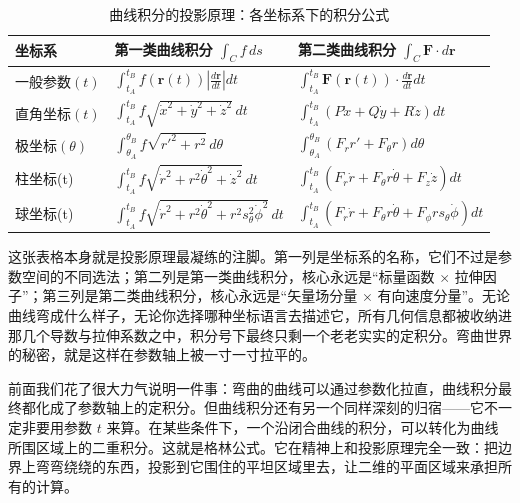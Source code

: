 \documentclass[UTF8]{ctexbook}
\begin{document}
\begin{table}[htbp]
\centering
\caption{曲线积分的投影原理：各坐标系下的积分公式}
\medskip
\label{tab:curve_integral}
\renewcommand{\arraystretch}{1.6}
\begin{tabular}{p{2.8cm}|p{6.5cm}|p{6.5cm}}
\toprule
\textbf{坐标系} & \textbf{第一类曲线积分 $\int_C f \, ds$} & \textbf{第二类曲线积分 $\int_C \mathbf{F} \cdot d\mathbf{r}$} \\
\midrule
一般参数\;$(t)$ & $\displaystyle \int_{t_A}^{t_B} f(\mathbf{r}(t)) \left| \frac{d\mathbf{r}}{dt} \right| dt$ & $\displaystyle \int_{t_A}^{t_B} \mathbf{F}(\mathbf{r}(t)) \cdot \frac{d\mathbf{r}}{dt} dt$ \\
\midrule
直角坐标\;$(t)$ & $\displaystyle \int_{t_A}^{t_B} f \sqrt{\dot{x}^2 + \dot{y}^2 + \dot{z}^2} \, dt$ & $\displaystyle \int_{t_A}^{t_B} \left( P\dot{x} + Q\dot{y} + R\dot{z} \right) dt$ \\
\midrule
极坐标\;$(\theta)$ & $\displaystyle \int_{\theta_A}^{\theta_B} f \sqrt{r'^2 + r^2} \, d\theta$ & $\displaystyle \int_{\theta_A}^{\theta_B} \left( F_r r' + F_\theta r \right) d\theta$ \\
\midrule
柱坐标\;(t) & $\displaystyle \int_{t_A}^{t_B} f \sqrt{\dot{r}^2 + r^2 \dot{\theta}^2 + \dot{z}^2} \, dt$ & $\displaystyle \int_{t_A}^{t_B} \left( F_r \dot{r} + F_\theta r \dot{\theta} + F_z \dot{z} \right) dt$ \\
\midrule
球坐标\;(t) & $\displaystyle \int_{t_A}^{t_B} f \sqrt{\dot{r}^2 + r^2 \dot{\theta}^2 + r^2 s_\theta^2 \dot{\phi}^2} \, dt$ & $\displaystyle \int_{t_A}^{t_B} \left( F_r \dot{r} + F_\theta r \dot{\theta} + F_\phi r s_\theta \dot{\phi} \right) dt$ \\
\bottomrule
\end{tabular}
\end{table}

这张表格本身就是投影原理最凝练的注脚。第一列是坐标系的名称，它们不过是参数空间的不同选法；第二列是第一类曲线积分，核心永远是“标量函数 $\times$ 拉伸因子”；第三列是第二类曲线积分，核心永远是“矢量场分量 $\times$ 有向速度分量”。无论曲线弯成什么样子，无论你选择哪种坐标语言去描述它，所有几何信息都被收纳进那几个导数与拉伸系数之中，积分号下最终只剩一个老老实实的定积分。弯曲世界的秘密，就是这样在参数轴上被一寸一寸拉平的。

前面我们花了很大力气说明一件事：弯曲的曲线可以通过参数化拉直，曲线积分最终都化成了参数轴上的定积分。但曲线积分还有另一个同样深刻的归宿——它不一定非要用参数 $t$ 来算。在某些条件下，一个沿闭合曲线的积分，可以转化为曲线所围区域上的二重积分。这就是格林公式。它在精神上和投影原理完全一致：把边界上弯弯绕绕的东西，投影到它围住的平坦区域里去，让二维的平面区域来承担所有的计算。
\end{document}
